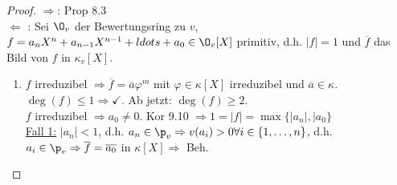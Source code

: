 

\begin{proof}
\glqq $\Rightarrow$\grqq: Prop 8.3\\
\glqq $\Leftarrow$ \grqq: Sei $\O_v$ der Bewertungsring zu $v$, $f=a_nX^n+a_{n-1}X^{n-1}+ \-ldots+a_0 \in \O_v[X]$ primitiv, d.h. $|f|=1$ und $\overline{f}$ das Bild von $f$ in $\kappa_v[X]$.
\begin{enumerate}[(1)]
\item $f$ irreduzibel $\Rightarrow \overline{f}=\overline{a} \varphi^m$ mit $\varphi \in \kappa[X]$ irreduzibel und $\overline{a} \in \kappa$.\\
$\deg(f) \leq 1 \Rightarrow \checkmark$. Ab jetzt: $\deg(f) \geq 2$.\\
$f$ irreduzibel $\Rightarrow  a_0 \neq 0$. Kor 9.10 $\Rightarrow 1=|f|=\max\{|a_n|, |a_0\}$\\
\underline{Fall 1:} $|a_n|<1$, d.h. $a_n \in \p_v \Rightarrow v(a_i)>0 \forall i \in \{1, \ldots, n\}$, d.h. $a_i \in \p_v \Rightarrow \overline{f}= \overline{a_0}$ in $\kappa[X] \Rightarrow$ Beh.
\end{enumerate}
\end{proof}
